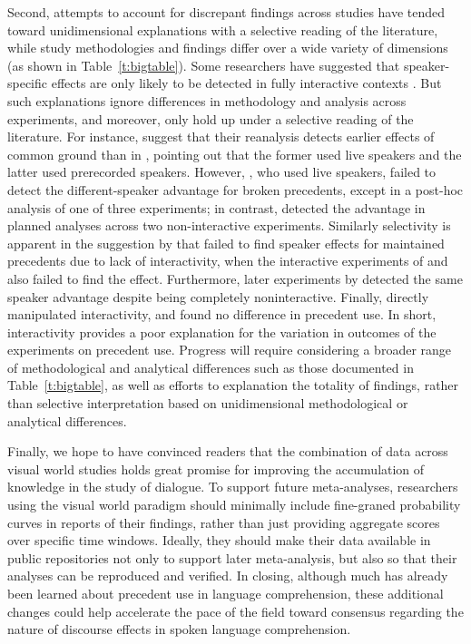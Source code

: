 \documentclass[doc,fignum,apacite,floatsintext]{apa6}
\begin{document}
Second, attempts to account for discrepant findings across studies have tended toward unidimensional explanations with a selective reading of the literature, while study methodologies and findings differ over a wide variety of dimensions (as shown in Table~\ref{t:bigtable}).  Some researchers have suggested that speaker-specific effects are only likely to be detected in fully interactive contexts \cite{brennanhanna09,brownschmidt09,brownschmidthanna11}.  But such explanations ignore differences in methodology and analysis across experiments, and moreover, only hold up under a selective reading of the literature.  For instance,  suggest that their reanalysis detects earlier effects of common ground than in , pointing out that the former used live speakers and the latter used prerecorded speakers.  However, , who used live speakers, failed to detect the different-speaker advantage for broken precedents, except in a post-hoc analysis of one of three experiments; in contrast,  detected the advantage in planned analyses across two non-interactive experiments.  Similarly selectivity is apparent in the suggestion by  that  failed to find speaker effects for maintained precedents due to lack of interactivity, when the interactive experiments of  and  also failed to find the effect.  Furthermore, later experiments by  detected the same speaker advantage despite being completely noninteractive.  Finally,  directly manipulated interactivity, and found no difference in precedent use.  In short, interactivity provides a poor explanation for the variation in outcomes of the experiments on precedent use.  Progress will require considering a broader range of methodological and analytical differences such as those documented in Table~\ref{t:bigtable}, as well as efforts to explanation the totality of findings, rather than selective interpretation based on unidimensional methodological or analytical differences.

Finally, we hope to have convinced readers that the combination of data across visual world studies holds great promise for improving the accumulation of knowledge in the study of dialogue.  To support future meta-analyses, researchers using the visual world paradigm should minimally include fine-graned probability curves in reports of their findings, rather than just providing aggregate scores over specific time windows.  Ideally, they should make their data available in public repositories not only to support later meta-analysis, but also so that their analyses can be reproduced and verified.  In closing, although much has already been learned about precedent use in language comprehension, these additional changes could help accelerate the pace of the field toward consensus regarding the nature of discourse effects in spoken language comprehension.


\end{document}
